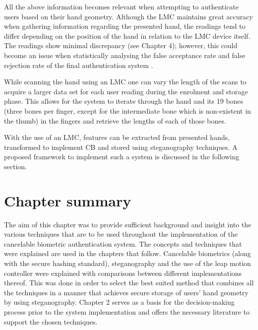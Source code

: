 All the above information becomes relevant when attempting to authenticate users based on their hand geometry. Although the LMC maintains great accuracy when gathering information regarding the presented hand, the readings tend to differ depending on the position of the hand in relation to the LMC device itself. The readings show minimal discrepancy (see Chapter 4); however, this could become an issue when statistically analysing the false acceptance rate and false rejection rate of the final authentication system \citep{Nagar2009}.

While scanning the hand using an LMC one can vary the length of the scans to acquire a larger data set for each user reading during the enrolment and storage phase. This allows for the system to iterate through the hand and its 19 bones (three bones per finger, except for the intermediate bone which is non-existent in the thumb) in the fingers and retrieve the lengths of each of those bones.

With the use of an LMC, features can be extracted from presented hands, transformed to implement CB and stored using steganography techniques. A proposed framework to implement such a system is discussed in the following section.


\section[Chapter summary]{Chapter summary}

The aim of this chapter was to provide sufficient background and insight into the various techniques that are to be used throughout the implementation of the cancelable biometric authentication system. The concepts and techniques that were explained are used in the chapters that follow. Cancelable biometrics (along with the secure hashing standard), steganography and the use of the leap motion controller were explained with comparisons between different implementations thereof. This was done in order to select the best suited method that combines all the techniques in a manner that achieves secure storage of users’ hand geometry by using steganography.
Chapter 2 serves as a basis for the decision-making process prior to the system implementation and offers the necessary literature to support the chosen techniques.


